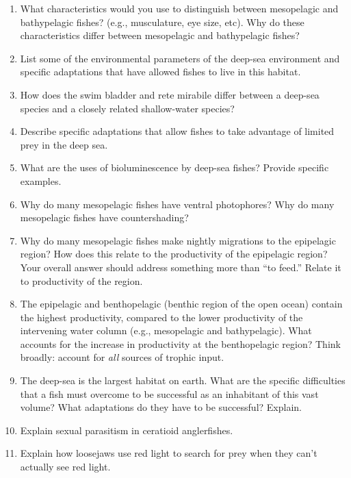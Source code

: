 \documentclass[letterpaper]{tufte-handout}
\begin{document}
\begin{enumerate}
	\item What characteristics would you use to distinguish between mesopelagic and bathypelagic fishes?  (e.g., musculature, eye size, etc).  Why do these characteristics differ between mesopelagic and bathypelagic fishes?

	\item List some of the environmental parameters of the deep-sea environment and specific adaptations that have allowed fishes to live in this habitat.

	\item How does the swim bladder and rete mirabile differ between a deep-sea species and a closely related shallow-water species?

	\item Describe specific adaptations that allow fishes to take advantage of limited prey in the deep sea.

	\item What are the uses of bioluminescence by deep-sea fishes?  Provide specific examples.

	\item Why do many mesopelagic fishes have ventral photophores?  Why do many mesopelagic fishes have countershading?

	\item Why do many mesopelagic fishes make nightly migrations to the epipelagic region?  How does this relate to the productivity of the epipelagic region? Your overall answer should address something more than “to feed.”  Relate it to productivity of the region.  

	\item The epipelagic and benthopelagic (benthic region of the open ocean) contain the highest productivity, compared to the lower productivity of the intervening water column (e.g., mesopelagic and bathypelagic).  What accounts for the increase in productivity at the benthopelagic region?  Think broadly: account for \emph{all} sources of trophic input.

	\item The deep-sea is the largest habitat on earth.  What are the specific difficulties that a fish must overcome to be successful as an inhabitant of this vast volume?  What adaptations do they have to be successful?  Explain.
	
	\item Explain sexual parasitism in ceratioid anglerfishes.

	\item Explain how loosejaws use red light to search for prey when they can’t actually see red light.

\end{enumerate}
\end{document}
